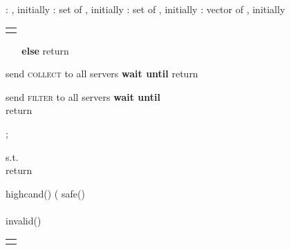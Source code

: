 \documentclass[10pt,conference,compsocconf]{IEEEtran}
\newcommand{\protocol}{PoWerStore}
\begin{document}
\begin{algo}[t]
\small

\begin{distribalgo}[1] \setcounter{ALC@line}{\value{alg:client1:lines}}
\smallskip
{}
\STATE : , initially 
\STATE : set of , initially 
\STATE : set of , initially 
\STATE : vector of , initially 
\ENDINDENT

\setcounter{alg:client1:lines}{\value{ALC@line}}
\end{distribalgo}
\begin{tabular}{c}\hline\mbox{}\hspace{0.45\textwidth}\mbox{}\end{tabular}
\vspace{-2 em}
\begin{distribalgo}[1]   \setcounter{ALC@line}{\value{alg:client1:lines}}

\STATE 
\STATE 
\STATE 
\STATE 
\IF {}
\STATE ~\label{alg:reader:select}
\STATE  ~\label{alg:reader:restore}
\ENDIF
\STATE \textbf{else} 
\STATE return 
\ENDINDENT

\medskip
{}
\STATE send \textsc{collect} to all servers
\STATE \textbf{wait until} 
\STATE return 
\ENDINDENT

\smallskip
{}
\STATE 
\STATE 
\ENDINDENT

\medskip
{}
\STATE send \textsc{filter} to all servers
\STATE \textbf{wait until} \\ 
\STATE return 
\ENDINDENT

\smallskip
{}
\STATE ; 
\STATE 
\ENDINDENT

\medskip
{}
\STATE  s.t. \\  \label{alg:reader:cc}
\STATE  \label{alg:reader:fr}
\STATE  \label{alg:reader:decode}
\STATE return 
\ENDINDENT

\medskip
{}
\STATE \textsf{highcand}()  (
\smallskip
\STATE \textsf{safe}()  \\ \label{alg:reader:safe}
\\

\smallskip
\STATE \textsf{invalid}()  
\ENDINDENT

\setcounter{alg:client1:lines}{\value{ALC@line}}
\end{distribalgo}
\begin{tabular}{c}\hline\mbox{}\hspace{0.45\textwidth}\mbox{}\end{tabular}
\caption{{Algorithm of client  in \protocol.}}\label{alg:reader}
\end{algo}
\end{document}
